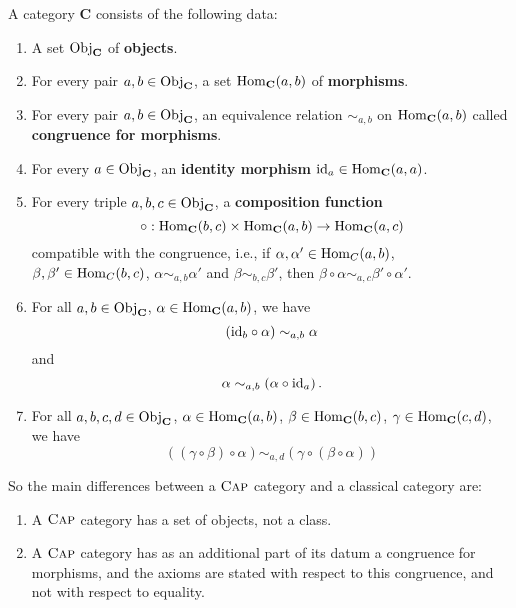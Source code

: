 \begin{definition}\label{definition:CapCategory}
 A \CapPkg category $\mathbf{C}$ consists of the following data:
 \begin{enumerate}
  \item A set $\mathrm{Obj}_{\mathbf{C}}$ of \textbf{objects}.
  \item For every pair $a,b \in \mathrm{Obj}_{\mathbf{C}}$, a set $\operatorname{\mathrm{Hom}}_{\mathbf{C}}( a, b )$ of \textbf{morphisms}.
  \item For every pair $a,b \in \mathrm{Obj}_{\mathbf{C}}$, an equivalence relation $\sim_{a,b}$ on $\operatorname{\mathrm{Hom}}_{\mathbf{C}}( a, b )$
  called \textbf{congruence for morphisms}.
  \item For every $a \in \mathrm{Obj}_{\mathbf{C}}$, an \textbf{identity morphism} $\mathrm{id}_a \in \operatorname{\mathrm{Hom}}_{\mathbf{C}}( a, a )$.
  \item For every triple $a, b, c \in \mathrm{Obj}_{\mathbf{C}}$, a \textbf{composition function}
  \[
   \circ: \operatorname{\mathrm{Hom}}_{\mathbf{C}}( b, c ) \times \operatorname{\mathrm{Hom}}_{\mathbf{C}}( a, b ) \rightarrow \operatorname{\mathrm{Hom}}_{\mathbf{C}}( a, c )
  \]
  compatible with the congruence, i.e., 
  if $\alpha, \alpha' \in \operatorname{\mathrm{Hom}}_{C}( a, b )$, 
  $\beta, \beta' \in \operatorname{\mathrm{Hom}}_{C}( b, c )$,
  $\alpha \sim_{a,b} \alpha'$ 
  and $\beta \sim_{b,c} \beta'$, 
  then $\beta \circ \alpha \sim_{a,c} \beta' \circ \alpha'$.
  \item For all $a, b \in \mathrm{Obj}_{\mathbf{C}}$, 
        $\alpha \in \operatorname{\mathrm{Hom}}_{\mathbf{C}}( a, b )$, 
        we have 
        \[
        \left( \mathrm{id}_{b} \circ \alpha \right) \sim_{a,b} \alpha
        \]
        and
        \[
        \alpha \sim_{a,b} \left( \alpha \circ \mathrm{id}_{a} \right).
        \]
  \item For all $a,b,c,d \in \mathrm{Obj}_{\mathbf{C}}$, 
        $\alpha \in \operatorname{\mathrm{Hom}}_{\mathbf{C}}( a, b )$, 
        $\beta \in \operatorname{\mathrm{Hom}}_{\mathbf{C}}( b, c )$, 
        $\gamma \in \operatorname{\mathrm{Hom}}_{\mathbf{C}}( c, d )$,
        we have
        \[
        \left(( \gamma \circ \beta ) \circ \alpha \right) \sim_{a,d} \left( \gamma \circ ( \beta \circ \alpha ) \right)
        \]
 \end{enumerate}
\end{definition}

So the main differences between a $\textsc{Cap}$ category and a classical category are:
\begin{enumerate}
 \item A $\textsc{Cap}$ category has a set of objects, not a class.
 \item A $\textsc{Cap}$ category has as an additional part of its datum a congruence for morphisms, and the
 axioms are stated with respect to this congruence, and not with respect to equality.
\end{enumerate}

